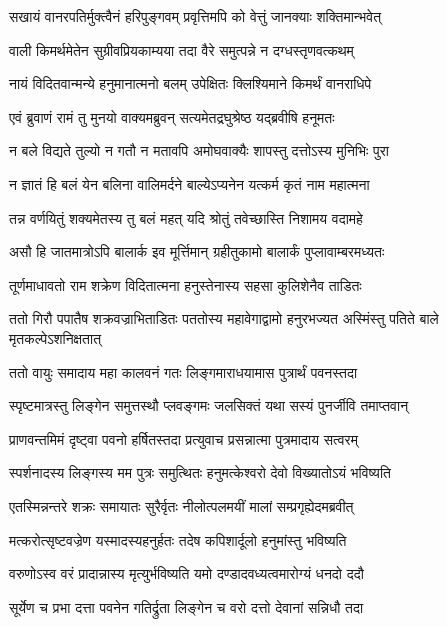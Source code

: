 \twolineshloka
{सखायं वानरपतिर्मुक्त्वैनं हरिपुङ्गवम्}
{प्रवृत्तिमपि को वेत्तुं जानक्याः शक्तिमान्भवेत्}%

\twolineshloka
{वाली किमर्थमेतेन सुग्रीवप्रियकाम्यया}
{तदा वैरे समुत्पन्ने न दग्धस्तृणवत्कथम्}%

\twolineshloka
{नायं विदितवान्मन्ये हनुमानात्मनो बलम्}
{उपेक्षितः क्लिश्यिमाने किमर्थं वानराधिपे}%

\twolineshloka
{एवं ब्रुवाणं रामं तु मुनयो वाक्यमब्रुवन्}
{सत्यमेतद्रघुश्रेष्ठ यद्ब्रवीषि हनूमतः}%

\twolineshloka
{न बले विद्यते तुल्यो न गतौ न मतावपि}
{अमोघवाक्यैः शापस्तु दत्तोऽस्य मुनिभिः पुरा}%

\twolineshloka
{न ज्ञातं हि बलं येन बलिना वालिमर्दने}
{बाल्येऽप्यनेन यत्कर्म कृतं नाम महात्मना}%

\twolineshloka
{तन्न वर्णयितुं शक्यमेतस्य तु बलं महत्}
{यदि श्रोतुं तवेच्छास्ति निशामय वदामहे}%

\twolineshloka
{असौ हि जातमात्रोऽपि बालार्क इव मूर्त्तिमान्}
{ग्रहीतुकामो बालार्कं पुप्लावाम्बरमध्यतः}%

\twolineshloka
{तूर्णमाधावतो राम शक्रेण विदितात्मना}
{हनुस्तेनास्य सहसा कुलिशेनैव ताडितः}%

\threelineshloka
{ततो गिरौ पपातैष शक्रवज्राभिताडितः}
{पततोस्य महावेगाद्वामो हनुरभज्यत}
{अस्मिंस्तु पतिते बाले मृतकल्पेऽशनिक्षतात्}%

\twolineshloka
{ततो वायुः समादाय महा कालवनं गतः}
{लिङ्गमाराधयामास पुत्रार्थं पवनस्तदा}%

\twolineshloka
{स्पृष्टमात्रस्तु लिङ्गेन समुत्तस्थौ प्लवङ्गमः}
{जलसिक्तं यथा सस्यं पुनर्जीवि तमाप्तवान्}%

\twolineshloka
{प्राणवन्तमिमं दृष्ट्वा पवनो हर्षितस्तदा}
{प्रत्युवाच प्रसन्नात्मा पुत्रमादाय सत्वरम्}%

\twolineshloka
{स्पर्शनादस्य लिङ्गस्य मम पुत्रः समुत्थितः}
{हनुमत्केश्वरो देवो विख्यातोऽयं भविष्यति}%

\twolineshloka
{एतस्मिन्नन्तरे शक्रः समायातः सुरैर्वृतः}
{नीलोत्पलमयीं मालां सम्प्रगृह्येदमब्रवीत्}%

\twolineshloka
{मत्करोत्सृष्टवज्रेण यस्मादस्यहनुर्हतः}
{तदेष कपिशार्दूलो हनुमांस्तु भविष्यति}%

\twolineshloka
{वरुणोऽस्व वरं प्रादान्नास्य मृत्युर्भविष्यति}
{यमो दण्डादवध्यत्वमारोग्यं धनदो ददौ}%

\twolineshloka
{सूर्येण च प्रभा दत्ता पवनेन गतिर्द्रुता}
{लिङ्गेन च वरो दत्तो देवानां सन्निधौ तदा}%

